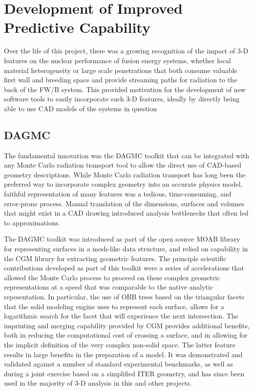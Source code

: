 \chapter{Development of Improved Predictive Capability}

Over the life of this project, there was a growing recognition of the impact
of 3-D features on the nuclear performance of fusion energy systems, whether
local material heterogeneity or large scale penetrations that both consume
valuable first wall and breeding space and provide streaming paths for
radiation to the back of the \gls{FW/B} system.  This provided motivation for
the development of new software tools to easily incorporate such 3-D features,
ideally by directly being able to use \gls{CAD} models of the systems in
question

\section{\acrfull{DAGMC}}

The fundamental innovation was the \gls{DAGMC} toolkit that can be integrated
with any Monte Carlo radiation transport tool to allow the direct use of
\gls{CAD}-based geometry descriptions.  While Monte Carlo radiation transport
has long been the preferred way to incorporate complex geometry into an
accurate physics model, faithful representation of many features was a
tedious, time-consuming, and error-prone process.  Manual translation of the
dimensions, surfaces and volumes that might exist in a \gls{CAD} drawing
introduced analysis bottlenecks that often led to approximations.

The \gls{DAGMC} toolkit was introduced as part of the
open source \gls{MOAB} library for representing surfaces in a
mesh-like data structure, and relied on capability in the
\gls{CGM} library for extracting geometric features.  The
principle scientific contributions developed as part of this toolkit were a
series of accelerations that allowed the Monte Carlo process to proceed on
these complex geometric representations at a speed that was comparable to the
native analytic repesentation.  In particular, the use of \gls{OBB} trees
based on the triangular facets that the solid modeling engine uses to
represent each surface, allows for a logarithmic search for the facet that
will experience the next intersection.  The imprinting and merging capability
provided by \gls{CGM} provides additional benefits, both in reducing the
computational cost of crossing a surface, and in allowing for the implicit
definition of the very complex non-solid space.  The latter feature results in
large benefits in the preparation of a model. It was
demonstrated and validated against a number of standard experimental
benchmarks, as well as during a joint exercise
based on a simplified ITER geometry, and has since
been used in the majority of 3-D analysis in this and other projects.

